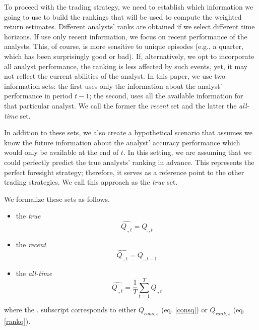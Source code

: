 \documentclass{article}
\newcommand{\tr}{\textit{true}}
\newcommand{\naive}{\textit{recent}}
\newcommand{\default}{\textit{all-time}}
\begin{document}
To proceed with the trading strategy, we need to establish which information we going to use to build the rankings that will be used to compute the weighted return estimates. Different analysts' ranks are obtained  if we select different time horizons. If use only recent information, we focus on recent performance of the analysts. This, of course, is more sensitive to unique episodes (e.g., a quarter, which has been surprisingly good or bad). If, alternatively, we opt to incorporate all analyst performance, the ranking is less affected by such events, yet, it may not reflect the current abilities of the analyst. In this paper, we use two information sets: the first uses only the  information about the analyst' performance in period $t-1$; the second, uses all the available  information for that particular analyst. We call the former the \naive{} set and the latter the \default{} set. 

In addition to these sets,  we also create a hypothetical scenario that assumes we know the future information about the analyst' accuracy performance which would only be available at the end of $t$. In this setting, we are assuming that we could  perfectly predict the true analysts' ranking in advance. This represents the perfect foresight strategy; therefore, it serves as a reference point to the other trading strategies. We call this approach as the \tr{} set. 

We formalize these sets as follows. 
\begin{itemize}
\item  the \tr{} %
\begin{equation}
\label{q:true}
\widehat{Q_{.,t}}=Q_{.,t}
\end{equation}

\item  the \naive{} %
\begin{equation}
\label{q:naive}
\widehat{Q_{.,t}}=Q_{.,t-1}
\end{equation}

\item  the \default{} %
\begin{equation}
\label{q:default}
\widehat{Q_{.,t}} = \frac{1}{T} \sum_{t=1}^{T} Q_{.,t}
\end{equation}
\end{itemize}
where the $.$ subscript corresponds to either $Q_{cons,s}$ (eq. \ref{consq}) or $Q_{rank,s}$ (eq. \ref{rankq}).
\end{document}
